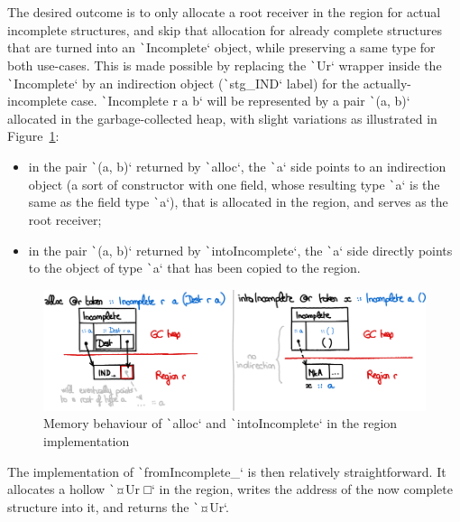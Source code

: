 \documentclass[english]{jflart}
\begin{document}
The desired outcome is to only allocate a root receiver in the region for actual incomplete structures, and skip that allocation for already complete structures that are turned into an \texttt`Incomplete` object, while preserving a same type for both use-cases. This is made possible by replacing the \texttt`Ur` wrapper inside the \texttt`Incomplete` by an indirection object (\texttt`stg_IND` label) for the actually-incomplete case. \texttt`Incomplete r a b` will be represented by a pair \texttt`(a, b)` allocated in the garbage-collected heap, with slight variations as illustrated in Figure~\ref{fig:schema-alloc-region}:
\begin{itemize}
  \item in the pair \texttt`(a, b)` returned by \texttt`alloc`, the \texttt`a` side points to an indirection object (a sort of constructor with one field, whose resulting type \texttt`a` is the same as the field type \texttt`a`), that is allocated in the region, and serves as the root receiver;
  \item in the pair \texttt`(a, b)` returned by \texttt`intoIncomplete`, the \texttt`a` side directly points to the object of type \texttt`a` that has been copied to the region.
\end{itemize}

\begin{figure}[t]\centering
  \includegraphics[width=12cm]{alloc-region.png}
  \caption{Memory behaviour of \texttt`alloc` and \texttt`intoIncomplete` in the region implementation}
  \label{fig:schema-alloc-region}
\end{figure}

The implementation of \texttt`fromIncomplete_` is then relatively straightforward. It allocates a hollow \texttt`¤Ur □` in the region, writes the address of the now complete structure into it, and returns the \texttt`¤Ur`.
\end{document}

